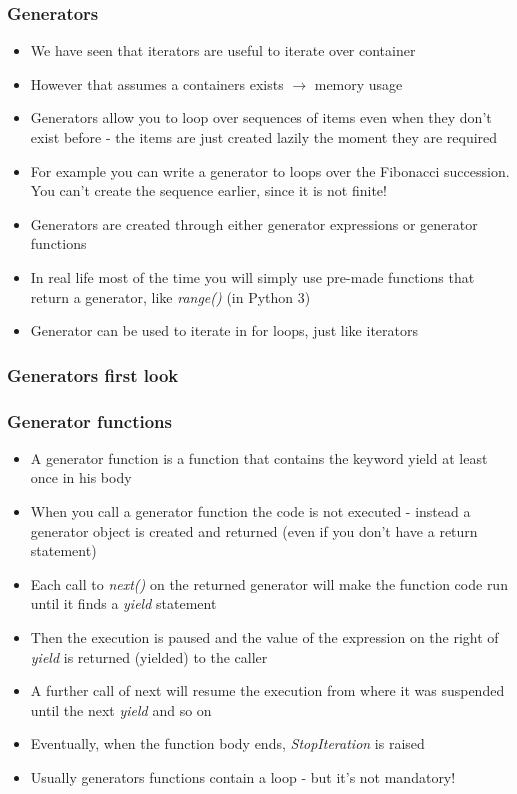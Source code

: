 \documentclass[9pt]{beamer}
\begin{document}
\begin{frame}
  \frametitle{Generators}

  \begin{itemize}
    \item We have seen that iterators are useful to iterate over container
    \item However that assumes a containers exists $\rightarrow$ memory usage
    \item \alert{Generators} allow you to loop over sequences of items even when
          they don't exist before - the items are just created \alert{lazily} the
          moment they are required
    \item For example you can write a generator to loops over the Fibonacci
          succession. You can't create the sequence earlier, since it is not
          finite!
    \item Generators are created through either \alert{generator expressions} or
          \alert{generator functions}
    \item In real life most of the time you will simply use pre-made functions
          that return a generator, like \emph{range()} (in Python 3)
    \item Generator can be used to iterate in for loops, just like iterators
  \end{itemize}

\end{frame}


\begin{frame}
  \frametitle{Generators first look}
  
\end{frame}


\begin{frame}
  \frametitle{Generator functions}

  \begin{itemize}
    \item A \alert{generator function} is a function that contains the keyword \alert{yield} at
          least once in his body
    \item When you call a generator function the code is not executed - instead
          a generator object is created and returned (even if you don't have a return statement)
    \item Each call to \emph{next()} on the returned generator will make the function code
          run until it finds a \emph{yield} statement
    \item Then the execution is paused and the value of the expression on the right
          of \emph{yield} is returned (yielded) to the caller
    \item A further call of next will resume the execution from where it was suspended
          until the next \emph{yield} and so on
    \item Eventually, when the function body ends, \emph{StopIteration} is raised
    \item Usually generators functions contain a loop - but it's not mandatory!
  \end{itemize}

\end{frame}
\end{document}
